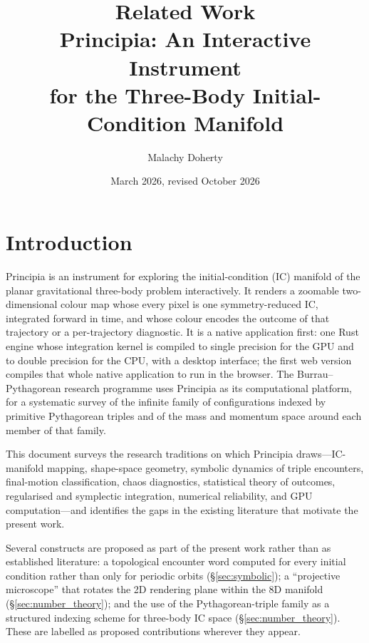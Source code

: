 \documentclass[11pt,a4paper]{article}
\title{\textbf{Related Work}\\[0.8ex]
\large Principia: An Interactive Instrument\\
for the Three-Body Initial-Condition Manifold}
\author{Malachy Doherty}
\date{March 2026, revised October 2026}
\begin{document}
\maketitle
\tableofcontents
\vspace{1em}

\section{Introduction}

Principia is an instrument for exploring the initial-condition (IC) manifold of the planar
gravitational three-body problem interactively.  It renders a zoomable two-dimensional colour
map whose every pixel is one symmetry-reduced IC, integrated forward in time, and whose colour
encodes the outcome of that trajectory or a per-trajectory diagnostic.  It is a native
application first: one Rust engine whose integration kernel is compiled to single precision for
the GPU and to double precision for the CPU, with a desktop interface; the first web version
compiles that whole native application to run in the browser.  The Burrau--Pythagorean research
programme uses Principia as its computational platform, for a systematic survey of the infinite
family of configurations indexed by primitive Pythagorean triples and of the mass and momentum
space around each member of that family.

This document surveys the research traditions on which Principia draws---IC-manifold mapping,
shape-space geometry, symbolic dynamics of triple encounters, final-motion classification, chaos
diagnostics, statistical theory of outcomes, regularised and symplectic integration, numerical
reliability, and GPU computation---and identifies the gaps in the existing literature that
motivate the present work.

Several constructs are proposed as part of the present work rather than as established
literature: a topological encounter word computed for every initial condition rather than only
for periodic orbits (\S\ref{sec:symbolic}); a ``projective microscope'' that rotates the 2D
rendering plane within the 8D manifold (\S\ref{sec:number_theory}); and the use of the
Pythagorean-triple family as a structured indexing scheme for three-body IC space
(\S\ref{sec:number_theory}).  These are labelled as proposed contributions wherever they appear.
\end{document}
